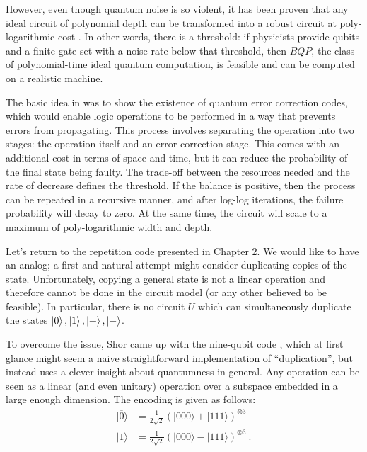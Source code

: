  

However, even though quantum noise is so violent, it has been proven that any ideal circuit of polynomial depth can be transformed into a robust circuit at poly-logarithmic cost \cite{aharonov1999faulttolerant}. In other words, there is a threshold: if physicists provide qubits and a finite gate set with a noise rate below that threshold, then $BQP$, the class of polynomial-time ideal quantum computation, is feasible and can be computed on a realistic machine.


The basic idea in \cite{aharonov1999faulttolerant} was to show the existence of quantum error correction codes, which would enable logic operations to be performed in a way that prevents errors from propagating. This process involves separating the operation into two stages: the operation itself and an error correction stage. This comes with an additional cost in terms of space and time, but it can reduce the probability of the final state being faulty. The trade-off between the resources needed and the rate of decrease defines the threshold. If the balance is positive, then the process can be repeated in a recursive manner, and after log-log iterations, the failure probability will decay to zero. At the same time, the circuit will scale to a maximum of poly-logarithmic width and depth.


Let's return to the repetition code presented in Chapter 2. We would like to have an analog; a first and natural attempt might consider duplicating copies of the state. Unfortunately, copying a general state is not a linear operation and therefore cannot be done in the circuit model (or any other believed to be feasible). In particular, there is no circuit $U$ which can simultaneously duplicate the states $\ket{0}, \ket{1}, \ket{+}, \ket{-}$.

To overcome the issue, Shor came up with the nine-qubit code \cite{Ninequ}, which at first glance might seem a naive straightforward implementation of ``duplication'', but instead uses a clever insight about quantumness in general. Any operation can be seen as a linear (and even unitary) operation over a subspace embedded in a large enough dimension. The encoding is given as follows: 
\begin{equation*}
  \begin{split}
    |\overline{0}\rangle&=\frac{1}{2\sqrt{2}}\left(|000\rangle+|111\rangle\right)^{\otimes3}\\
    |\overline{1}\rangle&=\frac{1}{2\sqrt{2}}\left(|000\rangle-|111\rangle\right)^{\otimes3}~.
  \end{split}
\end{equation*}


